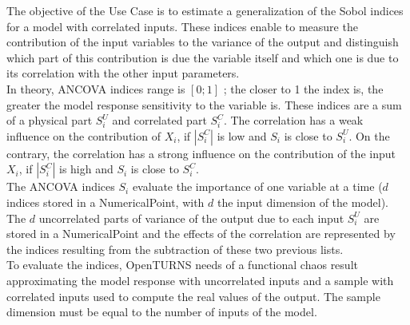 \renewcommand{\filename}{docUC_CentralUncertainty_ANCOVAIndices.tex}
\renewcommand{\filetitle}{UC : Sensitivity analysis : ANCOVA indices}

\HeaderIIILevel



The objective of the Use Case is to estimate a generalization of the Sobol indices for a model with correlated inputs. These indices enable to measure the contribution of the input variables to the variance of the output and distinguish which part of this contribution is due the variable itself and which one is due to its correlation with the other input parameters.\\
In theory, ANCOVA indices range is $\left[0; 1\right]$ ; the closer to 1 the index is, the greater the model response sensitivity to the variable is.
These indices are a sum of a physical part $S_i^U$ and correlated part $S_i^C$.
The correlation has a weak influence on the contribution of $X_i$, if $|S_i^C|$ is low and $S_i$ is close to $S_i^U$.
On the contrary, the correlation has a strong influence on the contribution of the input $X_i$, if $|S_i^C|$ is high and $S_i$ is close to $S_i^C$.\\

The ANCOVA indices $S_i$ evaluate the importance of one variable at a time ($d$ indices stored in a NumericalPoint, with $d$ the input dimension of the model).
The $d$ uncorrelated parts of variance of the output due to each input $S_i^U$ are stored in a NumericalPoint and the effects of the correlation are represented by the indices resulting from the subtraction of these two previous lists.\\

To evaluate the indices, OpenTURNS needs of a functional chaos result approximating the model response with uncorrelated inputs and a sample with correlated inputs used to compute the real values of the output. The sample dimension must be equal to the number of inputs of the model.\\

